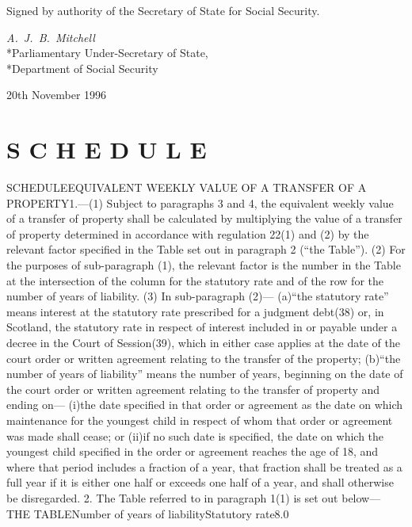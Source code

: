 \documentclass[a4paper]{article}
\newcommand{\parthead}{}
\begin{document}
\bigskip

Signed by authority of the Secretary of State for Social Security.

{\raggedleft
\emph{A.\ J.\ B.\ Mitchell}\\*Parliamentary Under-Secretary of
State,\\*Department of Social Security

}

20th November 1996

\clearpage

\part[Schedule]{S C H E D U L E}

\renewcommand\parthead{--- Schedule}

SCHEDULEEQUIVALENT WEEKLY VALUE OF A TRANSFER OF A PROPERTY1.—(1) Subject to
paragraphs 3 and 4, the equivalent weekly value of a transfer of property shall
be calculated by multiplying the value of a transfer of property determined in
accordance with regulation 22(1) and (2) by the relevant factor specified in the
Table set out in paragraph 2 (“the Table”).
(2) For the purposes of sub-paragraph (1), the relevant factor is the number in
the Table at the intersection of the column for the statutory rate and of the
row for the number of years of liability.
(3) In sub-paragraph (2)—
(a)“the statutory rate” means interest at the statutory rate prescribed for a
judgment debt(38) or, in Scotland, the statutory rate in respect of interest
included in or payable under a decree in the Court of Session(39), which in
either case applies at the date of the court order or written agreement relating
to the transfer of the property;
(b)“the number of years of liability” means the number of years, beginning on
the date of the court order or written agreement relating to the transfer of
property and ending on—
(i)the date specified in that order or agreement as the date on which
maintenance for the youngest child in respect of whom that order or agreement
was made shall cease; or
(ii)if no such date is specified, the date on which the youngest child specified
in the order or agreement reaches the age of 18,
and where that period includes a fraction of a year, that fraction shall be
treated as a full year if it is either one half or exceeds one half of a year,
and shall otherwise be disregarded.
2.  The Table referred to in paragraph 1(1) is set out below—
THE TABLENumber of years of liabilityStatutory
rate8.0%
\end{document}
